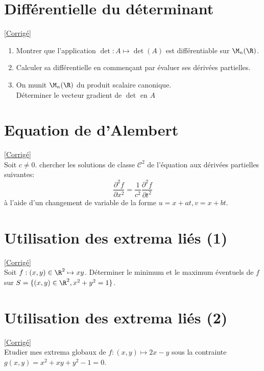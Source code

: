 \documentclass{book}
\begin{document}
\section{Différentielle du déterminant}
\label{Différentielle du déterminant}
\textcolor{blue}{\hyperref[sec:differentielle-du-determinant]{[Corrigé]}}\\
\begin{enumerate}
	\item Montrer que l'application $\det:A\mapsto \det(A)$ est différentiable sur $\M_n(\R)$.
	\item Calculer sa différentielle en commençant par évaluer ses dérivées partielles.
	\item On munit $\M_n(\R)$ du produit scalaire canonique.
	\\Déterminer le vecteur gradient de $\det$ en $A$
\end{enumerate}

\section{Equation de d'Alembert}
\label{Equation de d'Alembert}
\textcolor{blue}{\hyperref[sec:equation-de-dalembert]{[Corrigé]}}\\
Soit $c\ne0$. chercher les solutions de classe $\mathcal{C}^2$ de l'équation aux dérivées partielles suivantes: $$\frac{\partial^2f}{\partial x^2}=\frac{1}{c^2}\frac{\partial^2f}{\partial t^2}$$
à l'aide d'un changement de variable de la forme $u=x+at,v=x+bt$.

\section{Utilisation des extrema liés (1)}
\label{Utilisation des extrema liés 1}
\textcolor{blue}{\hyperref[sec:utilisation-des-extremas-lies-1]{[Corrigé]}}\\
Soit $f:(x,y)\in\R^2\mapsto xy$. Déterminer le minimum et le maximum éventuels de $f$ sur $S=\{(x,y)\in\R^2,x^2+y^2=1\}$.

\section{Utilisation des extrema liés (2)}
\label{Utilisation des extrema liés 2}
\textcolor{blue}{\hyperref[sec:utilisation-des-extremas-lies-2]{[Corrigé]}}\\
Etudier mes extrema globaux de $f:(x,y)\mapsto 2x-y$ sous la contrainte $g(x,y)=x^2+xy+y^2-1=0$.
\end{document}

